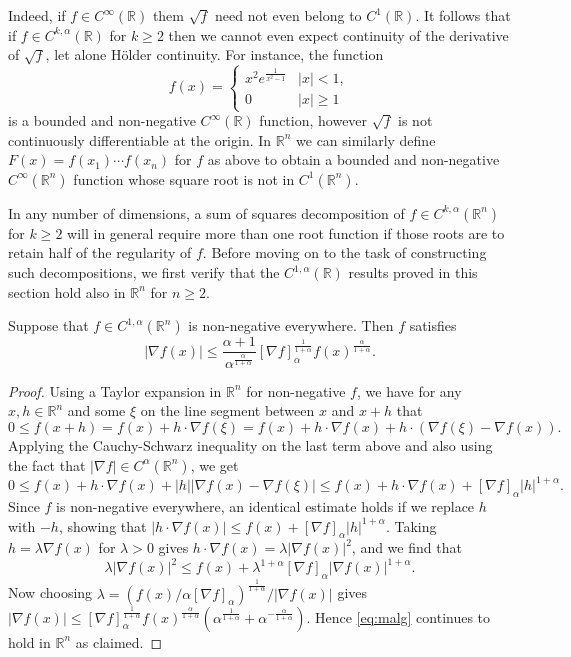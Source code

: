\documentclass[oneside,hidelinks,indentfirst,10pt]{book}
\begin{document}
Indeed, if \(f\in C^\infty(\mathbb{R})\) them \(\sqrt{f}\) need not even belong to \(C^1(\mathbb{R})\). It follows that if \(f\in C^{k,\alpha}(\mathbb{R})\) for \(k\geq 2\) then we cannot even expect continuity of the derivative of \(\sqrt{f}\), let alone H\"older continuity. For instance, the function 
\begin{equation}\label{eq:badroot}
    f(x)=\begin{cases}
    x^2e^\frac{1}{x^2-1} & |x|<1,\\
    0 & |x|\geq 1
    \end{cases}
\end{equation}
is a bounded and non-negative \(C^\infty(\mathbb{R})\) function, however \(\sqrt{f}\) is not continuously differentiable at the origin. In \(\mathbb{R}^n\) we can similarly define \(F(x)=f(x_1)\cdots f(x_n)\) for \(f\) as above to obtain a bounded and non-negative \(C^\infty(\mathbb{R}^n)\) function whose square root is not in \(C^1(\mathbb{R}^n)\).


In any number of dimensions, a sum of squares decomposition of \(f\in C^{k,\alpha}(\mathbb{R}^n)\) for \(k\geq 2\) will in general require more than one root function if those roots are to retain half of the regularity of \(f\). Before moving on to the task of constructing such decompositions, we first verify that the \(C^{1,\alpha}(\mathbb{R})\) results proved in this section hold also in \(\mathbb{R}^n\) for \(n\geq 2\).


\begin{thm}
Suppose that \(f\in C^{1,\alpha}(\mathbb{R}^n)\) is non-negative everywhere. Then \(f\) satisfies 
\[
    |\nabla f(x)|\leq \frac{\alpha+1}{\alpha^\frac{\alpha}{1+\alpha}}[\nabla f]_\alpha^\frac{1}{1+\alpha}f(x)^\frac{\alpha}{1+\alpha}.
\]
\end{thm}


\begin{proof}
Using a Taylor expansion in \(\mathbb{R}^n\) for non-negative \(f\), we have for any \(x,h\in\mathbb{R}^n\) and some \(\xi\) on the line segment between \(x\) and \(x+h\) that
\[
    0\leq f(x+h)=f(x)+h\cdot\nabla f(\xi)=f(x)+h\cdot\nabla f(x)+h\cdot(\nabla f(\xi)-\nabla f(x)).
\]
Applying the Cauchy-Schwarz inequality on the last term above and also using the fact that \(|\nabla f|\in C^{\alpha}(\mathbb{R}^n)\), we get
\[
    0\leq f(x)+h\cdot\nabla f(x)+|h||\nabla f(x)-\nabla f(\xi)|\leq f(x)+h\cdot\nabla f(x) +[\nabla f]_\alpha|h|^{1+\alpha}.
\]
Since \(f\) is non-negative everywhere, an identical estimate holds if we replace \(h\) with \(-h\), showing that \(|h\cdot\nabla f(x)|\leq f(x) +[\nabla f]_\alpha|h|^{1+\alpha}\). Taking \(h=\lambda\nabla f(x)\) for \(\lambda>0\) gives \(h\cdot\nabla f(x)=\lambda|\nabla f(x)|^2\), and we find that
\[
    \lambda|\nabla f(x)|^2\leq f(x) +\lambda^{1+\alpha}[\nabla f]_\alpha|\nabla f(x)|^{1+\alpha}.
\]
Now choosing \(\lambda=(f(x)/\alpha[\nabla f]_\alpha)^\frac{1}{1+\alpha}/|\nabla f(x)|\) gives \(|\nabla f(x)|\leq [\nabla f]_\alpha^\frac{1}{1+\alpha}f(x)^\frac{\alpha}{1+\alpha}(\alpha^\frac{1}{1+\alpha}+\alpha^{-\frac{\alpha}{1+\alpha}})\). Hence \eqref{eq:malg} continues to hold in \(\mathbb{R}^n\) as claimed.
\end{proof} 
\end{document}
